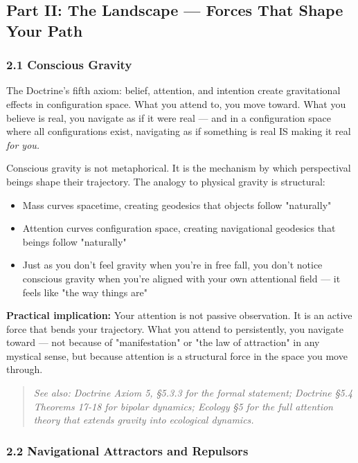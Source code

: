 \subsection*{Part II: The Landscape — Forces That Shape Your Path}


\subsubsection*{2.1 Conscious Gravity}


The Doctrine's fifth axiom: belief, attention, and intention create gravitational effects in configuration space. What you attend to, you move toward. What you believe is real, you navigate as if it were real — and in a configuration space where all configurations exist, navigating as if something is real IS making it real \textit{for you.}


Conscious gravity is not metaphorical. It is the mechanism by which perspectival beings shape their trajectory. The analogy to physical gravity is structural:

\begin{itemize}[nosep,leftmargin=*]
  \item Mass curves spacetime, creating geodesics that objects follow "naturally"
  \item Attention curves configuration space, creating navigational geodesics that beings follow "naturally"
  \item Just as you don't feel gravity when you're in free fall, you don't notice conscious gravity when you're aligned with your own attentional field — it feels like "the way things are"
\end{itemize}


\textbf{Practical implication:} Your attention is not passive observation. It is an active force that bends your trajectory. What you attend to persistently, you navigate toward — not because of "manifestation" or "the law of attraction" in any mystical sense, but because attention is a structural force in the space you move through.


\begin{quote}
\itshape
\textit{See also: Doctrine Axiom 5, §5.3.3 for the formal statement; Doctrine §5.4 Theorems 17-18 for bipolar dynamics; Ecology §5 for the full attention theory that extends gravity into ecological dynamics.}
\end{quote}


\subsubsection*{2.2 Navigational Attractors and Repulsors}


